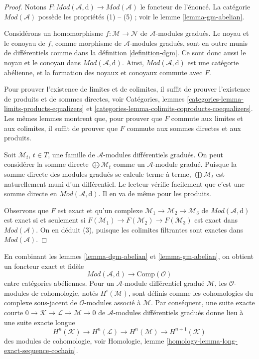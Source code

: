 \begin{proof}
Notons $F : \textit{Mod}(\mathcal{A}, \text{d}) \to \textit{Mod}(\mathcal{A})$ le foncteur de l'énoncé.
La catégorie $\textit{Mod}(\mathcal{A})$ possède les propriétés (1) -- (5) ; voir le lemme \ref{lemma-gm-abelian}.

\medskip\noindent
Considérons un homomorphisme $f : \mathcal{M} \to \mathcal{N}$ de $\mathcal{A}$-modules gradués.
Le noyau et le conoyau de $f$, comme morphisme de $\mathcal{A}$-modules gradués, sont en outre munis de différentiels comme dans la définition \ref{definition-dgm}.
Ce sont donc aussi le noyau et le conoyau dans $\textit{Mod}(\mathcal{A}, \text{d})$.
Ainsi, $\textit{Mod}(\mathcal{A}, \text{d})$ est une catégorie abélienne, et la formation des noyaux et conoyaux commute avec $F$.

\medskip\noindent
Pour prouver l'existence de limites et de colimites, il suffit de prouver l'existence de produits et de sommes directes, voir Catégories, lemmes \ref{categories-lemma-limits-products-equalizers} et \ref{categories-lemma-colimits-coproducts-coequalizers}.
Les mêmes lemmes montrent que, pour prouver que $F$ commute aux limites et aux colimites, il suffit de prouver que $F$ commute aux sommes directes et aux produits.

\medskip\noindent
Soit $\mathcal{M}_t$, $t \in T$, une famille de $\mathcal{A}$-modules différentiels gradués.
On peut considérer la somme directe $\bigoplus \mathcal{M}_t$ comme un $\mathcal{A}$-module gradué.
Puisque la somme directe des modules gradués se calcule terme à terme, $\bigoplus \mathcal{M}_t$ est naturellement muni d'un différentiel.
Le lecteur vérifie facilement que c'est une somme directe en $\textit{Mod}(\mathcal{A}, \text{d})$.
Il en va de même pour les produits.

\medskip\noindent
Observons que $F$ est exact et qu'un complexe $\mathcal{M}_1 \to \mathcal{M}_2 \to \mathcal{M}_3$ de $\textit{Mod}(\mathcal{A}, \text{d})$ est exact si et seulement si $F(\mathcal{M}_1) \to F(\mathcal{M}_2) \to F(\mathcal{M}_3)$ est exact dans $\textit{Mod}(\mathcal{A})$.
On en déduit (3), puisque les colimites filtrantes sont exactes dans $\textit{Mod}(\mathcal{A})$.
\end{proof}

\noindent
En combinant les lemmes \ref{lemma-dgm-abelian} et \ref{lemma-gm-abelian}, on obtient un foncteur exact et fidèle
$$
\textit{Mod}(\mathcal{A}, \text{d}) \longrightarrow \text{Comp}(\mathcal{O})
$$
entre catégories abéliennes.
Pour un $\mathcal{A}$-module différentiel gradué $\mathcal{M}$, les $\mathcal{O}$-modules de cohomologie, notés $H^i(\mathcal{M})$, sont définis comme les cohomologies du complexe sous-jacent de $\mathcal{O}$-modules associé à $\mathcal{M}$.
Par conséquent, une suite exacte courte $0 \to \mathcal{K} \to \mathcal{L} \to \mathcal{M} \to 0$ de $\mathcal{A}$-modules différentiels gradués donne lieu à une suite exacte longue
\begin{equation}
\label{equation-les}
H^n(\mathcal{K}) \to H^n(\mathcal{L}) \to H^n(\mathcal{M}) \to
H^{n + 1}(\mathcal{K})
\end{equation}
des modules de cohomologie, voir Homologie, lemme \ref{homology-lemma-long-exact-sequence-cochain}.

